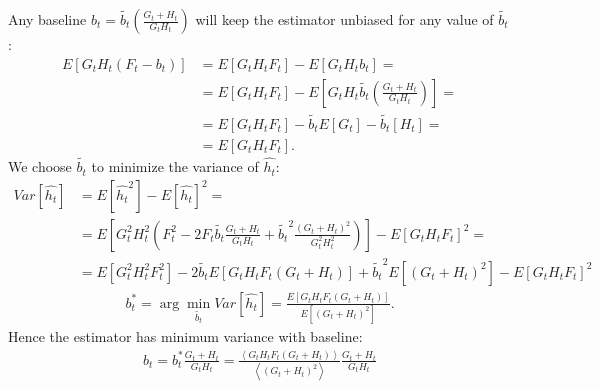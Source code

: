 Any baseline $b_t = \tilde{b_t}\left(\frac{G_{t} + H_{t}}{G_{t}H_{t}}\right)$ will keep the estimator unbiased for any value of $\tilde{b_t}$:
\allowdisplaybreaks
\begin{align*}
E\left[ G_{t}H_{t}\left(F_t - b_t\right) \right] 
&= 
E\left[ G_{t}H_{t}F_t\right] - E\left[G_{t}H_{t}b_t \right]
= \\ &=
E\left[ G_{t}H_{t}F_t\right] - E\left[G_{t}H_{t}\tilde{b_t}\left(\frac{G_{t} + H_{t}}{G_{t}H_{t}}\right) \right]
= \\ &=
E\left[ G_{t}H_{t}F_t\right] - \tilde{b_t}E\left[G_{t} \right] - \tilde{b_t}\left[H_{t} \right]
= \\ &=
E\left[ G_{t}H_{t}F_t\right].
\end{align*}
\allowdisplaybreaks[0]
We choose $\tilde{b_t}$ to minimize the variance of $\hat{h_t}$:
\allowdisplaybreaks
\begin{align*}
Var[\hat{h_t}] &= E\left[\hat{h_{t}}^2\right] - E\left[\hat{h_t}\right]^2
= \\ &=
E\left[ G_t^2 H_t^2 \left(F_t^2 - 2F_{t}\tilde{b_t}\frac{G_t+H_t}{G_t H_t} + \tilde{b_t}^2\frac{(G_t + H_t)^2}{G_t^2 H_t^2}\right) \right] - E\left[G_t H_t F_t\right]^2
= \\ &=
E\left[ G_t^2 H_t^2 F_t^2 \right] - 2\tilde{b_t}E\left[ G_t H_t F_t \left(G_t + H_t\right) \right] + \tilde{b_t}^2E\left[ \left(G_t + H_t\right)^2 \right] - E\left[G_t H_t F_t\right]^2
\end{align*}
\allowdisplaybreaks[0]
\begin{align*}
b_t^* = \arg\min_{\tilde{b_t}} Var\left[\hat{h_t}\right] = \frac{E\left[G_t H_t F_t \left(G_t + H_t\right)\right]}{E\left[\left(G_t + H_t\right)^2\right]}.
\end{align*}
Hence the estimator has minimum variance with baseline:
\begin{align*}
b_t = b_t^* \frac{G_t + H_t}{G_t H_t} = \frac{\left< G_t H_t F_t \left(G_t + H_t\right) \right>}{\left< \left( G_t + H_t \right)^2 \right>}\frac{G_t + H_t}{G_t H_t}
\end{align*}

